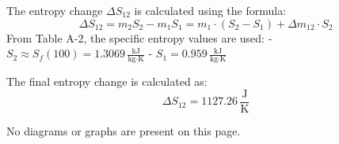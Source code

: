 The entropy change \( \Delta S_{12} \) is calculated using the formula:  
\[
\Delta S_{12} = m_2 S_2 - m_1 S_1 = m_1 \cdot (S_2 - S_1) + \Delta m_{12} \cdot S_2
\]  
From Table A-2, the specific entropy values are used:  
- \( S_2 \approx S_f(100) = 1.3069 \, \frac{\text{kJ}}{\text{kg·K}} \)  
- \( S_1 = 0.959 \, \frac{\text{kJ}}{\text{kg·K}} \)  

The final entropy change is calculated as:  
\[
\Delta S_{12} = 1127.26 \, \frac{\text{J}}{\text{K}}
\]  

No diagrams or graphs are present on this page.